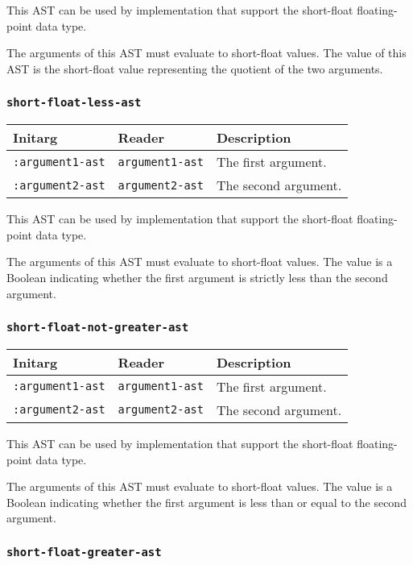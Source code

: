 This AST can be used by implementation that support the short-float
floating-point data type.  

The arguments of this AST must evaluate to short-float
values.  The value of this AST is the short-float value
representing the quotient of the two arguments.

\subsubsection{\texttt{short-float-less-ast}}
\label{sec-ast-short-float-less}

\begin{tabular}{|l|l|l|}
\hline
Initarg & Reader & Description\\
\hline\hline
\texttt{:argument1-ast} & \texttt{argument1-ast} & The first argument.\\
\hline
\texttt{:argument2-ast} & \texttt{argument2-ast} & The second argument.\\
\hline
\end{tabular}

This AST can be used by implementation that support the short-float
floating-point data type.  

The arguments of this AST must evaluate to short-float
values.  The value is a Boolean indicating whether the first argument
is strictly less than the second argument.

\subsubsection{\texttt{short-float-not-greater-ast}}
\label{sec-ast-short-float-not-greater}

\begin{tabular}{|l|l|l|}
\hline
Initarg & Reader & Description\\
\hline\hline
\texttt{:argument1-ast} & \texttt{argument1-ast} & The first argument.\\
\hline
\texttt{:argument2-ast} & \texttt{argument2-ast} & The second argument.\\
\hline
\end{tabular}

This AST can be used by implementation that support the short-float
floating-point data type.  

The arguments of this AST must evaluate to short-float
values.  The value is a Boolean indicating whether the first argument
is less than or equal to the second argument.

\subsubsection{\texttt{short-float-greater-ast}}
\label{sec-ast-short-float-greater}

